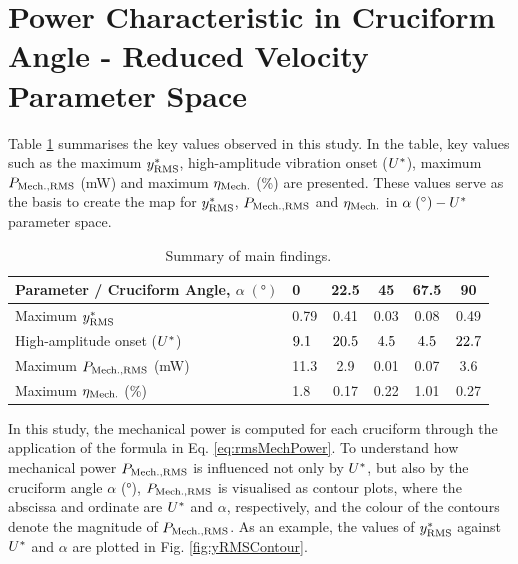 \documentclass[oneside]{utmthesis}
\begin{document}
\section{Power Characteristic in Cruciform Angle - Reduced Velocity Parameter Space}\label{sec:powerCharacteristic}

\vspace{\baselineskip}

Table \ref{tab:mainFindings} summarises the key values observed in this study. In the table, key values such as the maximum $y^{*}_{\text{RMS}}$, high-amplitude vibration onset ($U^{*}$), maximum $P_{\text{Mech.,RMS}}$ (mW) and maximum $\eta_{\text{Mech.}}$ (\%) are presented. These values serve as the basis to create the map for $y^{*}_{\text{RMS}}$, $P_{\text{Mech.,RMS}}$ and $\eta_{\text{Mech.}}$ in $\alpha \; (\si{\degree})-\ured$ parameter space.

 \begin{table}[!ht]
 \centering
 \caption{Summary of main findings.} \label{tab:mainFindings}
 \vspace{\baselineskip}
 \setlength{\tabcolsep}{10pt}      %
 \renewcommand{\arraystretch}{1.5} %
 \begin{tabular}{l l c c c c}
   \hline
   \hline
 Parameter / Cruciform Angle, $\alpha \; (\si{\degree})$ & 0       & 22.5    & 45      & 67.5    & 90      \\
   \hline
 Maximum $y^{*}_{\text{RMS}}$                                       & 0.79    & 0.41    & 0.03    & 0.08    & 0.49    \\
 High-amplitude onset ($U^{*}$)                        & $9.1$ & $20.5$ & $4.5$ & $4.5$ & $22.7$ \\
 Maximum $P_{\text{Mech.,RMS}}$ (mW)               & 11.3    & 2.9     & 0.01    & 0.07    & 3.6     \\
 Maximum $\eta_{\text{Mech.}}$ (\%)        & 1.8     & 0.17    & 0.22    & 1.01    & 0.27    \\
   \hline
   \hline
 \end{tabular}
 \end{table}

In this study, the mechanical power is computed for each cruciform through the application of the formula in Eq. \ref{eq:rmsMechPower}. To understand how mechanical power $P_{\text{Mech.,RMS}}$ is influenced not only by $U^{*}$, but also by the cruciform angle $\alpha$ (\si{\degree}), $P_{\text{Mech.,RMS}}$ is visualised as contour plots, where the abscissa and ordinate are $U^{*}$ and $\alpha$, respectively, and the colour of the contours denote the magnitude of $P_{\text{Mech.,RMS}}$. As an example, the values of $y^{*}_{\text{RMS}}$ against $U^{*}$ and $\alpha$ are plotted in Fig. \ref{fig:yRMSContour}.
\end{document}
